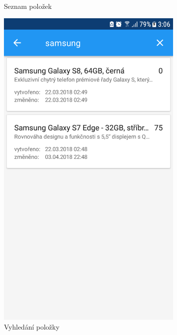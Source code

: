 \documentclass[12pt]{report}
\begin{document}
\begin{figure}[H]
\begin{subfigure}[b]{0.3\textwidth}
	\caption{Seznam položek}
	\label{fig:Screenshot_20180412-030432}
  \end{subfigure}
  \begin{subfigure}[b]{0.3\textwidth}
    \centering
	\includegraphics[width=\textwidth]{../images/client_android/Screenshot_20180412-030648.png}	
	\caption{Vyhledání položky}
	\label{fig:Screenshot_20180412-030648}
  \end{subfigure}
  \begin{subfigure}[b]{0.3\textwidth}

\end{subfigure}
\end{figure}
\end{document}
